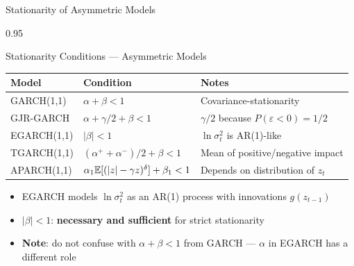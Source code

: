 \documentclass[9pt, aspectratio=169, t]{beamer}
\begin{document}
\begin{frame}{Stationarity of Asymmetric Models}
    \begin{cminipage}{0.95\textwidth}
    {\footnotesize
        \begin{block}{Stationarity Conditions --- Asymmetric Models}
            \begin{center}
            \begin{tabular}{lll}
                \toprule
                \textbf{Model} & \textbf{Condition} & \textbf{Notes} \\
                \midrule
                GARCH(1,1) & $\alpha + \beta < 1$ & Covariance-stationarity \\
                GJR-GARCH & $\alpha + \gamma/2 + \beta < 1$ & $\gamma/2$ because $P(\varepsilon<0) = 1/2$ \\
                EGARCH(1,1) & $|\beta| < 1$ & $\ln \sigma_t^2$ is AR(1)-like \\
                TGARCH(1,1) & $(\alpha^+ + \alpha^-)/2 + \beta < 1$ & Mean of positive/negative impact \\
                APARCH(1,1) & $\alpha_1 \mathbb{E}[(|z|-\gamma z)^\delta] + \beta_1 < 1$ & Depends on distribution of $z_t$ \\
                \bottomrule
            \end{tabular}
            \end{center}
        \end{block}
        \vspace{-1mm}
                \begin{prop}
            \begin{itemize}\setlength{\itemsep}{0pt}
                \item EGARCH models $\ln \sigma_t^2$ as an AR(1) process with innovations $g(z_{t-1})$
                \item $|\beta| < 1$: \textbf{necessary and sufficient} for strict stationarity
                \item \textbf{Note}: do not confuse with $\alpha + \beta < 1$ from GARCH --- $\alpha$ in EGARCH has a different role
            \end{itemize}
        \end{prop}
    }
    \end{cminipage}
\end{frame}
\end{document}
